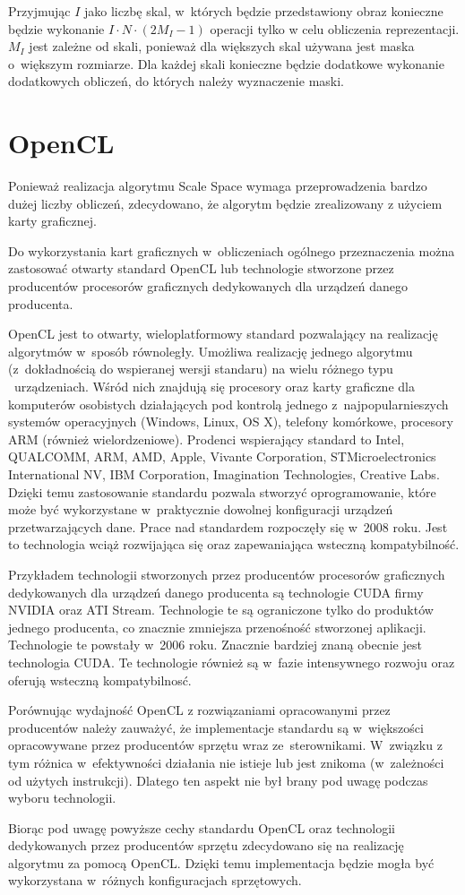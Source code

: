 Przyjmując $ I $ jako liczbę skal, w~których będzie przedstawiony obraz konieczne będzie wykonanie $ I \cdot N \cdot (2M_I - 1) $ operacji tylko w celu obliczenia reprezentacji. $ M_I $ jest zależne od skali, ponieważ dla większych skal używana jest maska o~większym rozmiarze. Dla każdej skali konieczne będzie dodatkowe wykonanie dodatkowych obliczeń, do których należy wyznaczenie maski. 

\section{OpenCL}
\label{sec:OpenCL}

Ponieważ realizacja algorytmu Scale Space wymaga przeprowadzenia bardzo dużej liczby obliczeń, zdecydowano, że algorytm będzie zrealizowany z użyciem karty graficznej.

Do wykorzystania kart graficznych w~obliczeniach ogólnego przeznaczenia można zastosować otwarty standard OpenCL lub technologie stworzone przez producentów procesorów graficznych dedykowanych dla urządzeń danego producenta.

OpenCL jest to otwarty, wieloplatformowy standard pozwalający na realizację algorytmów w~sposób równoległy. Umożliwa realizację jednego algorytmu (z~dokładnością do wspieranej wersji standaru) na wielu różnego typu ~urządzeniach. Wśród nich znajdują się procesory oraz karty graficzne dla komputerów osobistych działających pod kontrolą jednego z~najpopularnieszych systemów operacyjnych (Windows, Linux, OS X), telefony komórkowe, procesory ARM (również wielordzeniowe). Prodenci wspierający standard to Intel,
QUALCOMM,
ARM,
AMD,
Apple,
Vivante Corporation,
STMicroelectronics International NV,
IBM Corporation,
Imagination Technologies,
Creative Labs.
Dzięki temu zastosowanie standardu pozwala stworzyć oprogramowanie, które może być wykorzystane w~praktycznie dowolnej konfiguracji urządzeń przetwarzających dane. Prace nad standardem rozpoczęły się w~2008 roku. Jest to technologia wciąż rozwijająca się oraz zapewaniająca wsteczną kompatybilność. 

Przykładem technologii stworzonych przez producentów procesorów graficznych dedykowanych dla urządzeń danego producenta są technologie CUDA firmy NVIDIA oraz ATI Stream. Technologie te są ograniczone tylko do produktów jednego producenta, co znacznie zmniejsza przenośność stworzonej aplikacji. Technologie te powstały w~2006 roku. Znacznie bardziej znaną obecnie jest technologia CUDA. Te technologie również są w~fazie intensywnego rozwoju oraz oferują wsteczną kompatybilnosć.

Porównując wydajność OpenCL z rozwiązaniami opracowanymi przez producentów należy zauważyć, że implementacje standardu są w~większości opracowywane przez producentów sprzętu wraz ze~sterownikami. W~związku z tym różnica w~efektywności działania nie istieje lub jest znikoma (w~zależności od użytych instrukcji). Dlatego ten aspekt nie był brany pod uwagę podczas wyboru technologii.

Biorąc pod uwagę powyższe cechy standardu OpenCL oraz technologii dedykowanych przez producentów sprzętu zdecydowano się na realizację algorytmu za pomocą OpenCL. Dzięki temu implementacja będzie mogła być wykorzystana w~różnych konfiguracjach sprzętowych.


